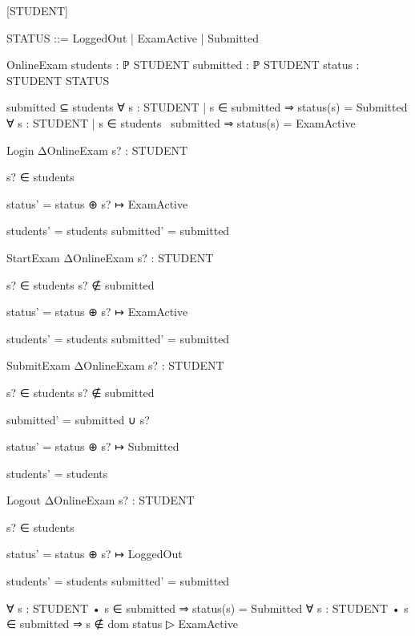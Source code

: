 [STUDENT]

STATUS ::= LoggedOut | ExamActive | Submitted

OnlineExam
students : ℙ STUDENT
submitted : ℙ STUDENT
status : STUDENT \pfun STATUS

submitted ⊆ students
∀ s : STUDENT | s ∈ submitted ⇒ status(s) = Submitted
∀ s : STUDENT | s ∈ students \ submitted ⇒ status(s) = ExamActive

Login
ΔOnlineExam
s? : STUDENT

s? ∈ students

status' = status ⊕ {s? ↦ ExamActive}

students' = students
submitted' = submitted

StartExam
ΔOnlineExam
s? : STUDENT

s? ∈ students
s? ∉ submitted

status' = status ⊕ {s? ↦ ExamActive}

students' = students
submitted' = submitted

SubmitExam
ΔOnlineExam
s? : STUDENT

s? ∈ students
s? ∉ submitted

submitted' = submitted ∪ {s?}

status' = status ⊕ {s? ↦ Submitted}

students' = students

Logout
ΔOnlineExam
s? : STUDENT

s? ∈ students

status' = status ⊕ {s? ↦ LoggedOut}

students' = students
submitted' = submitted

∀ s : STUDENT •
s ∈ submitted ⇒ status(s) = Submitted
∀ s : STUDENT •
s ∈ submitted ⇒ s ∉ dom status ▷ {ExamActive}